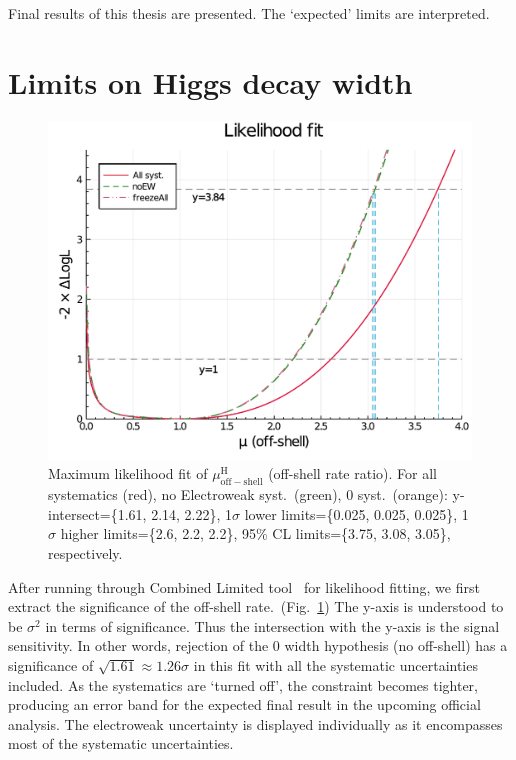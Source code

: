 Final results of this thesis are presented. The 
`expected' limits are interpreted.
\pagebreak
\section{Limits on Higgs decay width}
\begin{figure}[htb]
    \centering
    \includegraphics[width=.8\linewidth]{fig/Final_fit_mu_offshell.pdf}
    \caption{Maximum likelihood fit of $\mu^\mathrm{H}_\mathrm{off-shell}$ (off-shell rate ratio).
    For all systematics (red), no Electroweak syst.~(green),
    0 syst.~(orange): y-intersect=\{1.61, 2.14, 2.22\}, 1$\sigma$ lower limits=\{0.025, 0.025, 0.025\},
1$\sigma$ higher limits=\{2.6, 2.2, 2.2\}, 95\% CL limits=\{3.75, 3.08, 3.05\}, respectively.}
    \label{fig:final_fit_mu}
\end{figure}
After running through Combined Limited tool~\cite{combine1, combine2, combine3} for likelihood fitting, we first extract the significance
of the off-shell rate.~(Fig.~\ref{fig:final_fit_mu})
The y-axis is understood to be $\sigma^2$ in terms of significance. Thus
the intersection with the y-axis is the signal sensitivity. In other words,
rejection of the 0 width hypothesis (no off-shell) has a significance of 
$\sqrt{1.61} \approx 1.26\sigma$ in this fit with all the systematic uncertainties included.
As the systematics are `turned off', the constraint becomes tighter, producing an error band for the expected
final result in the upcoming official analysis. The electroweak uncertainty is displayed individually as
it encompasses most of the systematic uncertainties.

